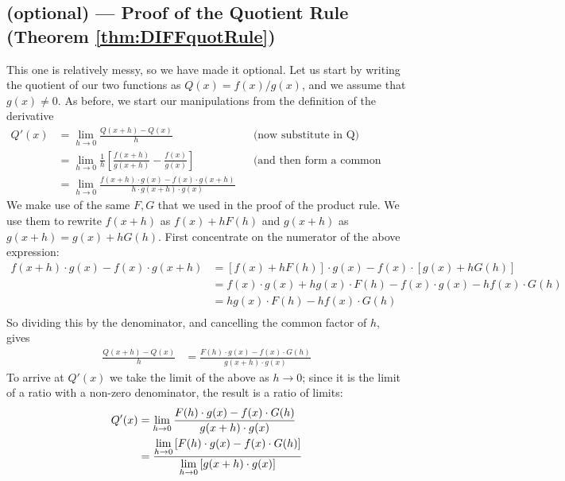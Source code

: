 \subsection*{(optional) --- Proof of the Quotient Rule
                (Theorem \ref{thm:DIFFquotRule})}
This one is relatively messy, so we have made it optional. Let us start by writing the
quotient of our two functions as $Q(x) = f(x) / g(x)$, and we assume that $g(x) \neq 0$.
As before, we start our manipulations from the definition of the derivative
\begin{align*}
Q'(x)
&=\lim_{h\to 0}\frac{Q(x+h)-Q(x)}{h} && \text{(now substitute in Q)}\\
& =\lim_{h\to 0}\frac{1}{h}
           \left[\frac{f(x+h)}{g(x+h)}-\frac{f(x)}{g(x)}\right] &&
\text{(and then form a common denominator)}\\
&=\lim_{h\to 0}
    \frac{ f(x+h)\cdot g(x) - f(x)\cdot g(x+h) }
                            {h \cdot g(x+h)\cdot g(x)}
\end{align*}
We make use of the same $F, G$ that we used in the proof of the product rule. We use
them to rewrite $f(x+h)$ as $f(x) + hF(h)$ and $g(x+h)$ as $g(x+h)=g(x)+hG(h)$.
First
concentrate on the numerator of the above expression:
\begin{align*}
f(x+h)\cdot g(x) - f(x)\cdot g(x+h)
&=[f(x)+hF(h)]\cdot g(x) - f(x)\cdot [g(x)+hG(h)]\\
&=f(x)\cdot g(x) + h g(x) \cdot F(h)  -f(x)\cdot g(x) - h f(x) \cdot G(h) \\
&= h g(x) \cdot F(h)  - h f(x) \cdot G(h) \\
\end{align*}
So dividing this by the denominator, and cancelling the common factor
of $h$, gives
\begin{align*}
\frac{Q(x+h)-Q(x)}{h}
  &= \frac{F(h) \cdot g(x) - f(x)\cdot G(h)}{g(x+h)\cdot g(x)}
\end{align*}
To arrive at $Q'(x)$ we take the limit of the above as $h \to 0$; since it
is the limit of a ratio with a non-zero denominator, the result is a ratio
of limits:
\begin{align*}
Q'(x)
&=\lim_{h\to 0}
\frac{F(h) \cdot g(x) - f(x)\cdot G(h)}{g(x+h)\cdot g(x)}\\
&=
\frac{\displaystyle \lim_{h\to 0} \left[ F(h) \cdot g(x) - f(x)\cdot G(h)\right]}
{\displaystyle \lim_{h \to 0} \left[ g(x+h)\cdot g(x)\right]}\\
\end{align*}

